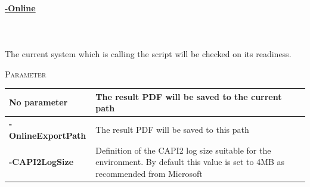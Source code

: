 \begin{tcolorbox}
    \paragraph{\underline{-Online}} \ \\\\
    The current system which is calling the script will be checked on its readiness.
    \vspace{0.3cm}
    \begin{center}
        \textsc{Parameter}
    \end{center}
    \vspace{-0.5cm}
    \begin{table}[H]
        \def\arraystretch{2}
        \centering
        \begin{tabular}{ p{4cm}  p{10cm} }  \hline
            \textbf{No parameter} & The result PDF will be saved to the current path \\ \hline
            \textbf{-OnlineExportPath} & The result PDF will be saved to this path \\ \hline
            \textbf{-CAPI2LogSize} & Definition of the CAPI2 log size suitable for the environment. By default this value is set to 4MB as recommended from Microsoft \cite{CAPI2} \\ \hline
        \end{tabular}
    \end{table}
\end{tcolorbox}

